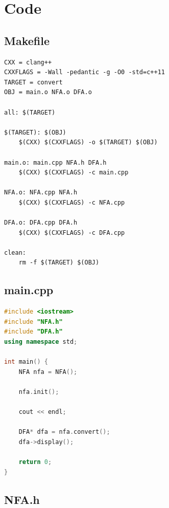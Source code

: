 \documentclass{article}
\begin{document}
\pagebreak

\section*{Code}

\subsection*{Makefile}

\begin{lstlisting}
CXX = clang++
CXXFLAGS = -Wall -pedantic -g -O0 -std=c++11
TARGET = convert
OBJ = main.o NFA.o DFA.o

all: $(TARGET)

$(TARGET): $(OBJ)
	$(CXX) $(CXXFLAGS) -o $(TARGET) $(OBJ)

main.o: main.cpp NFA.h DFA.h
	$(CXX) $(CXXFLAGS) -c main.cpp

NFA.o: NFA.cpp NFA.h
	$(CXX) $(CXXFLAGS) -c NFA.cpp

DFA.o: DFA.cpp DFA.h
	$(CXX) $(CXXFLAGS) -c DFA.cpp

clean:
	rm -f $(TARGET) $(OBJ)
\end{lstlisting}

\subsection*{main.cpp}

\begin{lstlisting}[language=C++]
#include <iostream>
#include "NFA.h"
#include "DFA.h"
using namespace std;

int main() {
	NFA nfa = NFA();

	nfa.init();

	cout << endl;

	DFA* dfa = nfa.convert();
	dfa->display();

	return 0;
}
\end{lstlisting}

\newpage

\subsection*{NFA.h}
\end{document}
